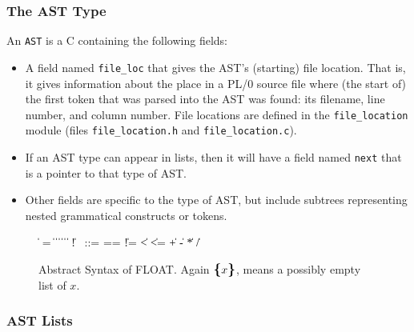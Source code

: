\documentclass[11pt]{article}
\begin{document}
\subsubsection{The AST Type}
\label{sec:ast-type}

An \texttt{AST} is a C  containing the following fields:
\begin{itemize}
\item
  A field named \lstinline!file_loc! that gives the AST's
  (starting) file location.
  That is, it gives information about the place in a PL/0 source
  file where (the start of) the first token that was parsed into the AST
  was found: its filename, line number, and column number.
  File locations are defined in the \lstinline!file_location! module
  (files \lstinline!file_location.h! and \lstinline!file_location.c!).

\item
  If an AST type can appear in lists, then it will have a field named 
  \lstinline!next! that is a pointer to that type of AST.

\item
  Other fields are specific to the type of AST, but include subtrees
  representing nested grammatical constructs or tokens.
\end{itemize}

\begin{figure}[hbp]
\begin{grammar}
 \:   
 \: 
 \:  
 \:  \| 
 \:  = 
         \> \| \>   
         \> \| \>   
         \> \| \>  
         \> \| \>  
 \: 
 \:  \|  \|  \| !~
 ::=   
 \: == \| != \| < \| <= \| + \| - \| * \| /
\end{grammar}
\caption{Abstract Syntax of FLOAT.
  Again $\textrm{\textbf{\large{\{}}}x\textrm{\textbf{\large{\}}}}$, means a possibly empty list of $x$.}
\label{fig:ast-grammar}
\end{figure}

\subsubsection{AST Lists}
\label{sec:ast-lists}
\end{document}
